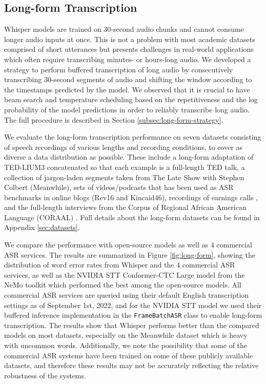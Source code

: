 \documentclass[nohyperref]{article}
\theoremstyle{plain}
\theoremstyle{definition}
\theoremstyle{remark}
\begin{document}
\subsection{Long-form Transcription}\label{subsec:long-form}

Whisper models are trained on 30-second audio chunks and cannot consume longer audio inputs at once. This is not a problem with most academic datasets comprised of short utterances but presents challenges in real-world applications which often require transcribing minutes- or hours-long audio. We developed a strategy to perform buffered transcription of long audio by consecutively transcribing 30-second segments of audio and shifting the window according to the timestamps predicted by the model. We observed that it is crucial to have beam search and temperature scheduling based on the repetitiveness and the log probability of the model predictions in order to reliably transcribe long audio. The full procedure is described in Section \ref{subsec:long-form-strategy}.

We evaluate the long-form transcription performance on seven datasets consisting of speech recordings of various lengths and recording conditions, to cover as diverse a data distribution as possible. These include a long-form adaptation of TED-LIUM3 \cite{Hernandez2018TEDLIUM3T} concatenated so that each example is a full-length TED talk, a collection of jargon-laden segments taken from The Late Show with Stephen Colbert (Meanwhile), sets of videos/podcasts that has been used as ASR benchmarks in online blogs (Rev16 and Kincaid46), recordings of earnings calls \cite{del2021earnings}, and the full-length interviews from the Corpus of Regional African American Language (CORAAL) \cite{gunter2021contextualizing}. Full details about the long-form datasets can be found in Appendix \ref{sec:datasets}.

We compare the performance with open-source models as well as 4 commercial ASR services. The results are summarized in Figure \ref{fig:long-form}, showing the distribution of word error rates from Whisper and the 4 commercial ASR services, as well as the NVIDIA STT Conformer-CTC Large model from the NeMo toolkit \cite{kuchaiev2019nemo} which performed the best among the open-source models. All commercial ASR services are queried using their default English transcription settings as of September 1st, 2022, and for the NVIDIA STT model we used their buffered inference implementation in the \texttt{FrameBatchASR} class to enable long-form transcription. The results show that Whisper performs better than the compared models on most datasets, especially on the Meanwhile dataset which is heavy with uncommon words. Additionally, we note the possibility that some of the commercial ASR systems have been trained on some of these publicly available datasets, and therefore these results may not be accurately reflecting the relative robustness of the systems.
\end{document}
